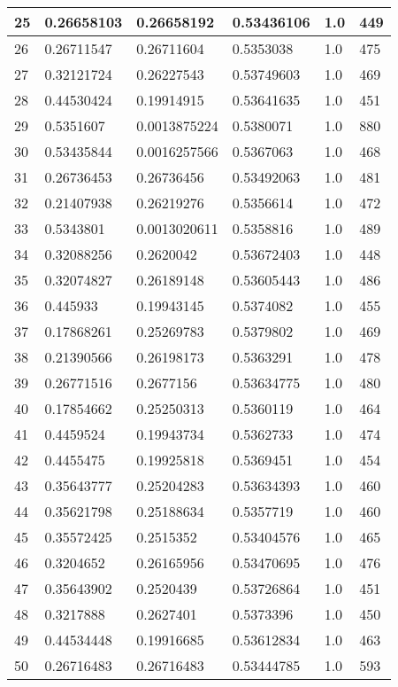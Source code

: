 \begin{longtable}{|l|l|l|l|l|l|}
25 & 0.26658103 & 0.26658192 & 0.53436106 & 1.0 & 449 \\ \hline 
26 & 0.26711547 & 0.26711604 & 0.5353038 & 1.0 & 475 \\ \hline 
27 & 0.32121724 & 0.26227543 & 0.53749603 & 1.0 & 469 \\ \hline 
28 & 0.44530424 & 0.19914915 & 0.53641635 & 1.0 & 451 \\ \hline 
29 & 0.5351607 & 0.0013875224 & 0.5380071 & 1.0 & 880 \\ \hline 
30 & 0.53435844 & 0.0016257566 & 0.5367063 & 1.0 & 468 \\ \hline 
31 & 0.26736453 & 0.26736456 & 0.53492063 & 1.0 & 481 \\ \hline 
32 & 0.21407938 & 0.26219276 & 0.5356614 & 1.0 & 472 \\ \hline 
33 & 0.5343801 & 0.0013020611 & 0.5358816 & 1.0 & 489 \\ \hline 
34 & 0.32088256 & 0.2620042 & 0.53672403 & 1.0 & 448 \\ \hline 
35 & 0.32074827 & 0.26189148 & 0.53605443 & 1.0 & 486 \\ \hline 
36 & 0.445933 & 0.19943145 & 0.5374082 & 1.0 & 455 \\ \hline 
37 & 0.17868261 & 0.25269783 & 0.5379802 & 1.0 & 469 \\ \hline 
38 & 0.21390566 & 0.26198173 & 0.5363291 & 1.0 & 478 \\ \hline 
39 & 0.26771516 & 0.2677156 & 0.53634775 & 1.0 & 480 \\ \hline 
40 & 0.17854662 & 0.25250313 & 0.5360119 & 1.0 & 464 \\ \hline 
41 & 0.4459524 & 0.19943734 & 0.5362733 & 1.0 & 474 \\ \hline 
42 & 0.4455475 & 0.19925818 & 0.5369451 & 1.0 & 454 \\ \hline 
43 & 0.35643777 & 0.25204283 & 0.53634393 & 1.0 & 460 \\ \hline 
44 & 0.35621798 & 0.25188634 & 0.5357719 & 1.0 & 460 \\ \hline 
45 & 0.35572425 & 0.2515352 & 0.53404576 & 1.0 & 465 \\ \hline 
46 & 0.3204652 & 0.26165956 & 0.53470695 & 1.0 & 476 \\ \hline 
47 & 0.35643902 & 0.2520439 & 0.53726864 & 1.0 & 451 \\ \hline 
48 & 0.3217888 & 0.2627401 & 0.5373396 & 1.0 & 450 \\ \hline 
49 & 0.44534448 & 0.19916685 & 0.53612834 & 1.0 & 463 \\ \hline 
50 & 0.26716483 & 0.26716483 & 0.53444785 & 1.0 & 593 \\ \hline 
\end{longtable}